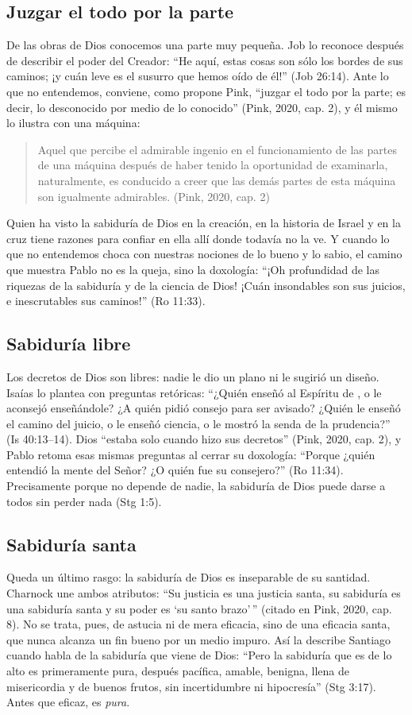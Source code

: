 \subsection{Juzgar el todo por la parte}
De las obras de Dios conocemos una parte muy pequeña. Job lo reconoce después de describir el poder del Creador: ``He aquí, estas cosas son sólo los bordes de sus caminos; ¡y cuán leve es el susurro que hemos oído de él!'' (Job 26:14). Ante lo que no entendemos, conviene, como propone Pink, ``juzgar el todo por la parte; es decir, lo desconocido por medio de lo conocido'' (Pink, 2020, cap. 2), y él mismo lo ilustra con una máquina:

\begin{quote}\small
Aquel que percibe el admirable ingenio en el funcionamiento de las partes de una máquina después de haber tenido la oportunidad de examinarla, naturalmente, es conducido a creer que las demás partes de esta máquina son igualmente admirables. (Pink, 2020, cap. 2)
\end{quote}

Quien ha visto la sabiduría de Dios en la creación, en la historia de Israel y en la cruz tiene razones para confiar en ella allí donde todavía no la ve. Y cuando lo que no entendemos choca con nuestras nociones de lo bueno y lo sabio, el camino que muestra Pablo no es la queja, sino la doxología: ``¡Oh profundidad de las riquezas de la sabiduría y de la ciencia de Dios! ¡Cuán insondables son sus juicios, e inescrutables sus caminos!'' (Ro 11:33).

\subsection{Sabiduría libre}
Los decretos de Dios son libres: nadie le dio un plano ni le sugirió un diseño. Isaías lo plantea con preguntas retóricas: ``¿Quién enseñó al Espíritu de \SENOR{}, o le aconsejó enseñándole? ¿A quién pidió consejo para ser avisado? ¿Quién le enseñó el camino del juicio, o le enseñó ciencia, o le mostró la senda de la prudencia?'' (Is 40:13--14). Dios ``estaba solo cuando hizo sus decretos'' (Pink, 2020, cap. 2), y Pablo retoma esas mismas preguntas al cerrar su doxología: ``Porque ¿quién entendió la mente del Señor? ¿O quién fue su consejero?'' (Ro 11:34). Precisamente porque no depende de nadie, la sabiduría de Dios puede darse a todos sin perder nada (Stg 1:5).

\subsection{Sabiduría santa}
Queda un último rasgo: la sabiduría de Dios es inseparable de su santidad. Charnock une ambos atributos: ``Su justicia es una justicia santa, su sabiduría es una sabiduría santa y su poder es `su santo brazo'\,'' (citado en Pink, 2020, cap. 8). No se trata, pues, de astucia ni de mera eficacia, sino de una eficacia santa, que nunca alcanza un fin bueno por un medio impuro. Así la describe Santiago cuando habla de la sabiduría que viene de Dios: ``Pero la sabiduría que es de lo alto es primeramente pura, después pacífica, amable, benigna, llena de misericordia y de buenos frutos, sin incertidumbre ni hipocresía'' (Stg 3:17). Antes que eficaz, es \emph{pura}.

